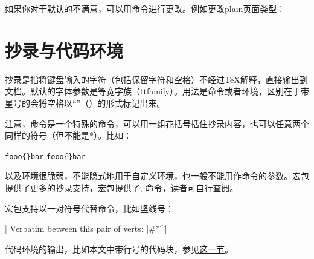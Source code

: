 如果你对于默认的不满意，可以用命令进行更改。例如更改plain页面类型：
\begin{latex}
\end{latex}

\section{抄录与代码环境}
抄录是指将键盘输入的字符（包括保留字符和空格）不经过\TeX 解释，直接输出到文档。默认的字体参数是等宽字族（ttfamily）。用法是命令或者环境，区别在于带星号的会将空格以“\textvisiblespace”（）的形式标记出来。

注意，命令是一个特殊的命令，可以用一组花括号括住抄录内容，也可以任意两个同样的符号（但不能是*）。比如：
\begin{latex}
\verb|fooo{}bar|
\verb+fooo{}bar+
\end{latex}

以及环境很脆弱，不能隐式地用于自定义环境，也一般不能用作命令的参数。宏包提供了更多的抄录支持，宏包提供了, 命令，读者可自行查阅。

宏包支持以一对符号代替命令，比如竖线号：
\begin{latex}
\MakeShortVerb|
Verbatim between this pair of verts: |#\?*^|
\end{latex}

代码环境的输出，比如本文中带行号的代码块，参见\hyperref[sec:coding]{这一节}。

